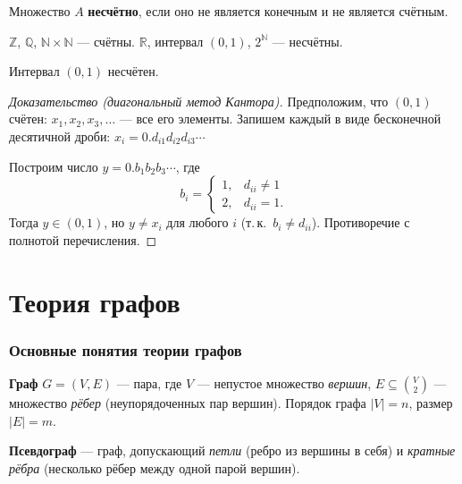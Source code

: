 \documentclass[12pt]{article}
\begin{document}
\begin{definition}
Множество $A$ \textbf{несчётно}, если оно не является конечным
и не является счётным.
\end{definition}

\begin{example}
$\mathbb{Z}$, $\mathbb{Q}$, $\mathbb{N}\times\mathbb{N}$ --- счётны.
$\mathbb{R}$, интервал $(0,1)$, $2^{\mathbb{N}}$ --- несчётны.
\end{example}

\begin{theorem}
Интервал $(0,1)$ несчётен.
\end{theorem}

\begin{proof}[Доказательство (диагональный метод Кантора)]
Предположим, что $(0,1)$ счётен: $x_1, x_2, x_3, \ldots$ ---
все его элементы. Запишем каждый в виде бесконечной десятичной
дроби: $x_i = 0.d_{i1}d_{i2}d_{i3}\cdots$

Построим число $y = 0.b_1 b_2 b_3 \cdots$, где
\[
b_i = \begin{cases} 1, & d_{ii} \neq 1 \\ 2, & d_{ii} = 1. \end{cases}
\]
Тогда $y \in (0,1)$, но $y \neq x_i$ для любого $i$
(т.\,к.\ $b_i \neq d_{ii}$). Противоречие с полнотой перечисления.
\end{proof}

\part{Теория графов}

\section{Основные понятия теории графов}

\begin{definition}
\textbf{Граф} $G = (V, E)$ --- пара, где $V$ --- непустое множество
\emph{вершин}, $E \subseteq \binom{V}{2}$ --- множество \emph{рёбер}
(неупорядоченных пар вершин). Порядок графа $|V| = n$,
размер $|E| = m$.
\end{definition}

\begin{definition}
\textbf{Псевдограф} --- граф, допускающий \emph{петли} (ребро
из вершины в себя) и \emph{кратные рёбра} (несколько рёбер между
одной парой вершин).
\end{definition}
\end{document}
